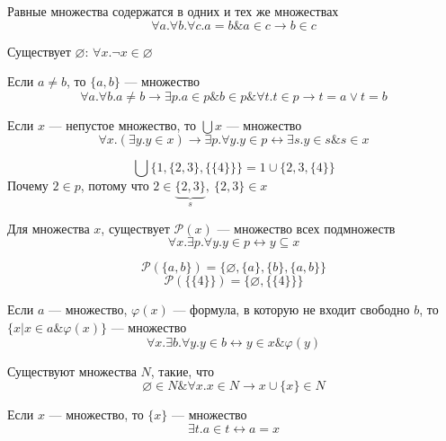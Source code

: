 \documentclass[english]{article}
\begin{document}
\begin{axiom}[равенства]
	Равные множества содержатся в одних и тех же множествах
	\[ \forall a.\forall b.\forall c. a = b\&a\in c\to b \in c \]
	\label{orge0c849f}
\end{axiom}
\begin{axiom}
	Существует \(\varnothing\): \(\forall x. \neg x \in \varnothing\)
	\label{org001ca4f}
\end{axiom}
\begin{axiom}[пары]
	Если \(a \neq b\), то \(\{a, b\}\) --- множество
	\[ \forall a. \forall b. a\neq b \to \exists p. a \in p \& b\in p \& \forall t. t \in p \to t = a \vee t = b \]
	\label{orgc77f1a7}
\end{axiom}
\begin{axiom}[объединения]
	Если \(x\) --- непустое множество, то \(\bigcup x\) --- множество
	\[ \forall x. (\exists y. y \in x) \to \exists p. \forall y. y\in p \leftrightarrow \exists s. y \in s \& s \in x \]
	\label{org04a2eee}
\end{axiom}
\begin{examp}
	\[ \bigcup \{1, \{2, 3\}, \{\{4\}\}\} = 1 \cup \{2, 3, \{4\}\}\]
	Почему \(2 \in p\), потому что \(2 \in \underbrace{\{2 , 3\}}_s,\ \{2, 3\} \in x\)
\end{examp}
\begin{axiom}[Степени]
	Для множества \(x\), существует \(\mathcal{P}(x)\) --- множество всех подмножеств
	\[ \forall x. \exists p. \forall y. y\in p \leftrightarrow y \subseteq x  \]
	\label{org3644d5a}
\end{axiom}
\begin{examp}
	\[ \mathcal{P}(\{a, b\}) = \{\varnothing, \{a\}, \{b\}, \{a, b\}\} \]
	\[ \mathcal{P}(\{\{4\}\}) = \{\varnothing, \{\{4\}\}\} \]
\end{examp}
\begin{axiom}
	Если \(a\) --- множество, \(\varphi(x)\) --- формула, в которую не входит свободно \(b\), то \(\{x \big| x \in a \& \varphi(x)\}\) --- множество
	\[ \forall x. \exists b. \forall y. y \in b \leftrightarrow y \in x \& \varphi(y) \]
	\label{org240fb46}
\end{axiom}
\begin{axiom}
	Существуют множества \(N\), такие, что
	\[ \varnothing \in N \& \forall x. x \in N \to x \cup \{x\} \in N \]
	\label{orgd559ac7}
\end{axiom}
\begin{theorem}
	Если \(x\) --- множество, то \(\{x\}\) --- множество
	\[ \exists t. a \in t \leftrightarrow a = x \]
\end{theorem}
\end{document}
